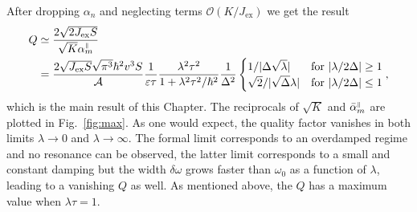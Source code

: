 After dropping $\alpha_n$ and neglecting terms $\mathcal{O}(K/J_\text{ex})$ we get the result
\begin{align}
    Q &\simeq \frac{2\sqrt{2J_\text{ex}S}}{\sqrt{K}{\alpha}_m^{{\scriptscriptstyle\parallel}}}\nonumber\\
    &=\frac{2\sqrt{J_\text{ex}S}\sqrt{\pi^3}\hbar^2v^3S}{\mathcal{A}}\frac{1}{\varepsilon\tau}\frac{\lambda^2\tau^2}{1+\lambda^2\tau^2/\hbar^2}\frac{1}{\Delta^2}
    \begin{cases}
        1/|\Delta\sqrt{\lambda}|
        &  \text{for } |\lambda/2\Delta| \geq 1 \\
        \sqrt{2}/|\sqrt{\Delta}\lambda|
        &  \text{for } |\lambda/2\Delta| \leq 1 
    \end{cases},
\end{align}
which is the main result of this Chapter. The reciprocals of $\sqrt{K}$ and $\bar{\alpha}_m^{{\scriptscriptstyle\parallel}}$ are plotted in Fig.~\ref{fig:max}. As one would expect, the quality factor vanishes in both limits $\lambda\rightarrow0$ and $\lambda\rightarrow\infty$. The formal limit corresponds to an overdamped regime and no resonance can be observed, the latter limit corresponds to a small and constant damping but the width $\delta\omega$ grows faster than $\omega_0$ as a function of $\lambda$, leading to a vanishing $Q$ as well. As mentioned above, the $Q$ has a maximum value when $\lambda\tau=1$. 

